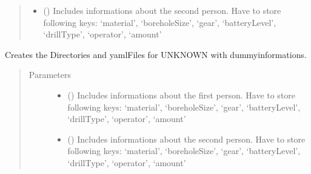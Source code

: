 \documentclass[letterpaper,10pt,english]{sphinxmanual}
\begin{document}
\begin{fulllineitems}
\begin{fulllineitems}
\begin{quote}
\begin{description}
\begin{itemize}
\item {} 
\sphinxAtStartPar
{} () \textendash{} Includes informations about the second person. Have to store following keys: ‘material’, ‘boreholeSize’, ‘gear’, ‘batteryLevel’, ‘drillType’, ‘operator’, ‘amount’

\end{itemize}

\end{description}\end{quote}

\end{fulllineitems}


\begin{fulllineitems}
\label{\detokenize{anoog.automation:anoog.automation.controller.Terminal.init_predict}}
\sphinxAtStartPar
Creates the Directories and yaml\sphinxhyphen{}Files for UNKNOWN with dummy\sphinxhyphen{}informations.
\begin{quote}\begin{description}
\item[{Parameters}] \leavevmode\begin{itemize}
\item {} 
\sphinxAtStartPar
{} () \textendash{} Includes informations about the first person. Have to store following keys: ‘material’, ‘boreholeSize’, ‘gear’, ‘batteryLevel’, ‘drillType’, ‘operator’, ‘amount’

\item {} 
\sphinxAtStartPar
{} () \textendash{} Includes informations about the second person. Have to store following keys: ‘material’, ‘boreholeSize’, ‘gear’, ‘batteryLevel’, ‘drillType’, ‘operator’, ‘amount’

\end{itemize}

\end{description}\end{quote}


\end{fulllineitems}
\end{fulllineitems}
\end{document}
